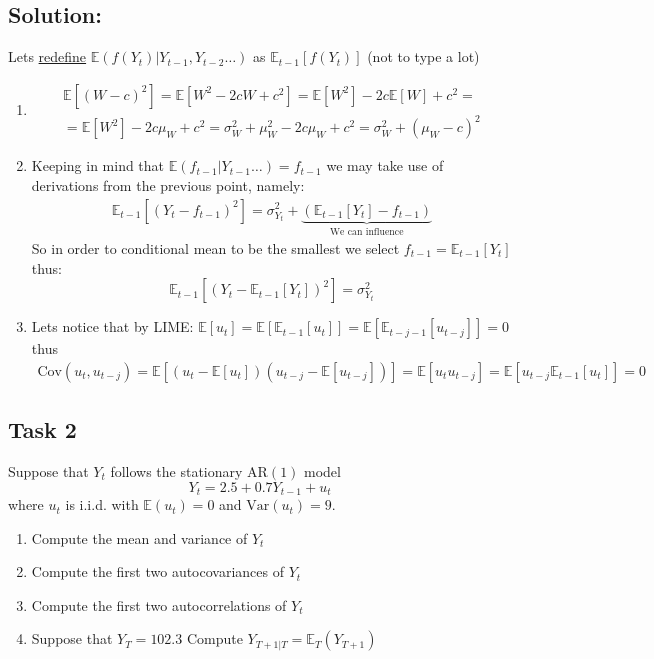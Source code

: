 \documentclass[10pt,a4paper]{amsart}
\newcommand{\E}{\mathbb{E}}
\newcommand{\V}{\text{Var}}
\newcommand{\C}{\text{Cov}}
\begin{document}
\subsection*{Solution:}
Lets \underline{redefine} $ \E(f(Y_t) | Y_{t-1}, Y_{t-2} \dots) $ as $ \E_{t-1}[ f(Y_t) ]$ (not to type a lot)
\begin{enumerate}
    \item \begin{gather*}
              \E \left[ (W - c)^{2} \right] = \E \left[ W^{2} - 2c W + c^{2} \right] = \E \left[ W^{2} \right] - 2c \E \left[ W \right] + c^{2}=  \\
              =\E \left[ W^{2} \right] - 2c \mu_W + c^{2} = \sigma^{2}_W + \mu_W^{2} - 2c\mu_W +c^{2} = \sigma^{2}_W + \left( \mu_W - c \right)^{2}
          \end{gather*}
    \item Keeping in mind that $ \E \left( f_{t-1} | Y_{t-1} \dots \right)  = f_{t-1}$ we may take
          use of derivations from the previous point, namely:
          \begin{gather*}
              \E_{t-1} [(Y_{t} − f_{t−1})^{2}] = \sigma^{2}_{Y_t} + \underbrace{\left(\E_{t-1}[ Y_t] - f_{t-1}\right)}_{\text{We can influence}}
          \end{gather*}
          So in order to conditional mean to be the smallest we select $ f_{t-1} = \E_{t-1} [Y_t] $
          thus:
          \[
              \E_{t-1} [(Y_{t} − \E_{t-1} \left[ Y_t \right])^{2}] =  \sigma^{2}_{Y_t}
          \]
    \item Lets notice that by LIME: $ \E \left[ u_t \right] = \E \left[ \E_{t-1} \left[ u_t \right] \right]
              = \E \left[ \E_{t-j-1} \left[ u_{t-j} \right] \right] = 0$ thus
          \begin{align*}
              \C (u_t, u_{t-j}) = \E \left[ \left(  u_t - \E\left[ u_t \right] \right) \left(  u_{t-j} - \E\left[ u_{t-j} \right] \right)\right] = \E \left[ u_t u_{t-j} \right]
              = \E \left[ u_{t-j} \E_{t-1} \left[ u_t \right]  \right] = 0
          \end{align*}
\end{enumerate}

\subsection*{Task 2}
Suppose that $ Y_t $ follows the stationary $ \text{AR}(1) $ model
\[Y_t = 2.5 + 0.7Y_{t−1} +u_t\] where $ u_t $ is i.i.d. with $ \E(u_t) = 0 $ and $\V(u_t) = 9  $.
\begin{enumerate}
    \item Compute the mean and variance of $ Y_t $
    \item Compute the first two autocovariances of $ Y_t $
    \item Compute the first two autocorrelations of $ Y_t $
    \item Suppose that $  Y_T = 102.3 $ Compute $   Y_{T +1|T} = \E_{T}(Y_{T +1}) $
\end{enumerate}
\end{document}
